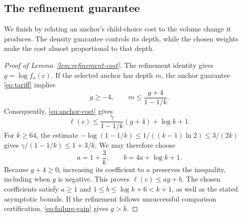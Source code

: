 \subsection{The refinement guarantee}\label{sec:refinement-guarantee}

We finish by relating an anchor's child-choice cost to the volume change
it produces. The density guarantee controls its depth, while the chosen
weights make the cost almost proportional to that depth.

\begin{proof}[Proof of Lemma~\ref{lem:refinement-cost}]
The refinement identity gives $g=\log f_x(c)$. If the selected anchor has
depth $m$, the anchor guarantee \eqref{eq:tariff} implies
\[
g\ge-4,\qquad m\le\frac{g+4}{1-1/k}.
\]
Consequently, \eqref{eq:anchor-cost} gives
\[
\ell(c)\le\frac{\gamma}{1-1/k}(g+4)+\log k+1.
\]
For $k\ge64$, the estimate
$-\log(1-1/k)\le1/((k-1)\ln2)\le3/(2k)$ gives
$\gamma/(1-1/k)\le1+3/k$. We may therefore choose
\[
a=1+\frac3k,\qquad b=4a+\log k+1.
\]
Because $g+4\ge0$, increasing its coefficient to $a$ preserves the
inequality, including when $g$ is negative. This proves $\ell(c)\le ag+b$.
The chosen coefficients satisfy $a\ge1$ and
$1\le b\le\log k+6<k+1$, as well as the stated asymptotic bounds.
If the refinement follows unsuccessful comparison certification,
\eqref{eq:failure-gain} gives $g>k$.
\end{proof}
